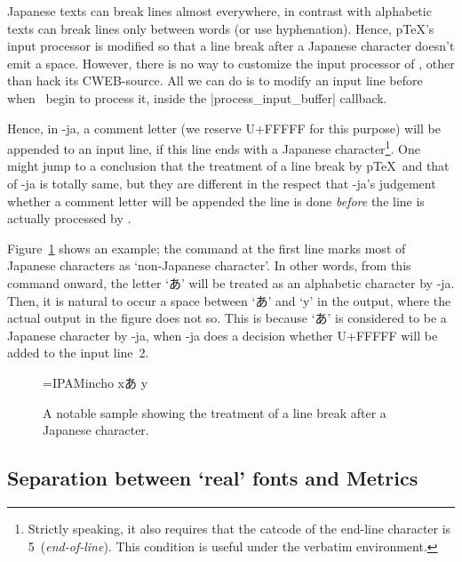 \documentclass{ajt}
\begin{document}
Japanese texts can break lines almost everywhere, in contrast with
alphabetic texts can break lines only between words (or use
hyphenation). Hence, p\TeX's input processor is modified so that a
line break after a Japanese character doesn't emit a space. However,
there is no way to customize the input processor of \LuaTeX, other than
hack its CWEB-source. All we can do is to modify an input line before
when \LuaTeX\ begin to process it, inside the |process_input_buffer|
callback.

Hence, in \LuaTeX-ja, a comment letter (we reserve U+FFFFF for this
purpose) will be appended to an input line, if this line ends with a Japanese
character\footnote{Strictly speaking, it also requires that the catcode
of the end-line character is 5~(\emph{end-of-line}). This condition is
useful under the verbatim environment.}. One might jump to a conclusion
that the treatment of a line break by p\TeX\ and that of \LuaTeX-ja is
totally same, but they are different in the respect that \LuaTeX-ja's
judgement whether a comment letter will be appended the line is done
\emph{before} the line is actually processed by \LuaTeX.

Figure~\ref{fig-linebreak} shows an example; the command at the first
line marks most of Japanese characters as `non-Japanese character'. In
other words, from this command onward, the letter `あ' will be treated
as an alphabetic character by \LuaTeX-ja. Then, it is natural to occur a
space between `あ' and `y' in the output, where the actual output in the
figure does not so.  This is because `あ' is considered to be a Japanese
character by \LuaTeX-ja, when \LuaTeX-ja does a decision whether U+FFFFF
will be added to the input line~2.

\begin{figure}
\begin{LTXexample}
\font\x=IPAMincho \x
{}xあ
y
\end{LTXexample}
\caption{A notable sample showing the treatment of a line break after a
Japanese character.}\label{fig-linebreak}
\end{figure}

\subsection{Separation between `real' fonts and Metrics}
\label{ssec-sepmet}
\end{document}
